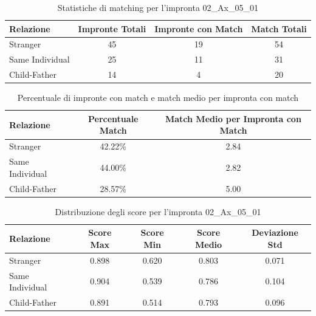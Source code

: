\begin{table}[htbp]
\centering
\caption{Statistiche di matching per l'impronta 02\_Ax\_05\_01}
\label{tab:results_02_Ax_05_01}
\begin{tabular}{|l|c|c|c|}
\hline
\textbf{Relazione} & \textbf{Impronte Totali} & \textbf{Impronte con Match} & \textbf{Match Totali} \\
\hline
Stranger & 45 & 19 & 54 \\
\hline
Same Individual & 25 & 11 & 31 \\
\hline
Child-Father & 14 & 4 & 20 \\
\hline
\end{tabular}
\end{table}


\begin{table}[htbp]
\centering
\caption{Percentuale di impronte con match e match medio per impronta con match}
\label{tab:match_percentage_02_Ax_05_01}
\begin{tabular}{|l|c|c|}
\hline
\textbf{Relazione} & \textbf{Percentuale Match} & \textbf{Match Medio per Impronta con Match} \\
\hline
Stranger & 42.22\% & 2.84 \\
\hline
Same Individual & 44.00\% & 2.82 \\
\hline
Child-Father & 28.57\% & 5.00 \\
\hline
\end{tabular}
\end{table}


\begin{table}[htbp]
\centering
\caption{Distribuzione degli score per l'impronta 02\_Ax\_05\_01}
\label{tab:scores_02_Ax_05_01}
\begin{tabular}{|l|c|c|c|c|}
\hline
\textbf{Relazione} & \textbf{Score Max} & \textbf{Score Min} & \textbf{Score Medio} & \textbf{Deviazione Std} \\
\hline
Stranger & 0.898 & 0.620 & 0.803 & 0.071 \\
\hline
Same Individual & 0.904 & 0.539 & 0.786 & 0.104 \\
\hline
Child-Father & 0.891 & 0.514 & 0.793 & 0.096 \\
\hline
\end{tabular}
\end{table}

